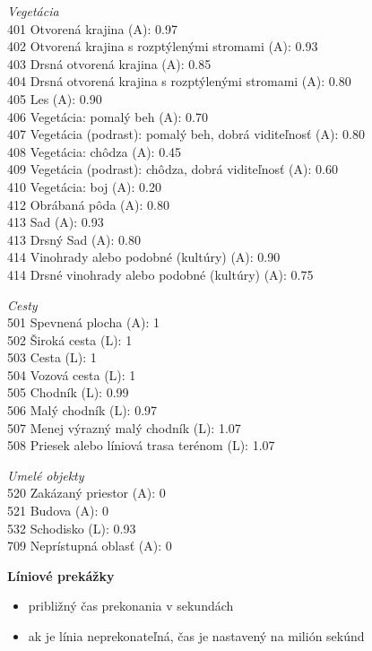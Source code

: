 \documentclass[12pt,a4paper]{report}
\begin{document}
\textit{Vegetácia}\\
401 Otvorená krajina (A): 0.97\\
402 Otvorená krajina s rozptýlenými stromami (A): 0.93\\
403 Drsná otvorená krajina (A): 0.85\\
404 Drsná otvorená krajina s rozptýlenými stromami (A): 0.80\\
405 Les (A): 0.90\\
406 Vegetácia: pomalý beh (A): 0.70\\
407 Vegetácia (podrast): pomalý beh, dobrá viditeľnosť (A): 0.80\\
408 Vegetácia: chôdza (A): 0.45\\
409 Vegetácia (podrast): chôdza, dobrá viditeľnosť (A): 0.60\\
410 Vegetácia: boj (A): 0.20\\
412 Obrábaná pôda (A): 0.80\\
413 Sad (A): 0.93\\
413 Drsný Sad (A): 0.80\\
414 Vinohrady alebo podobné (kultúry) (A): 0.90\\
414 Drsné vinohrady alebo podobné (kultúry) (A): 0.75

\textit{Cesty}\\
501 Spevnená plocha (A): 1\\
502 Široká cesta (L): 1\\
503 Cesta (L): 1\\
504 Vozová cesta (L): 1\\
505 Chodník (L): 0.99\\
506 Malý chodník (L): 0.97\\
507 Menej výrazný malý chodník (L): 1.07\\
508 Priesek alebo líniová trasa terénom (L): 1.07

\textit{Umelé objekty}\\
520 Zakázaný priestor (A): 0\\
521 Budova (A): 0\\
532 Schodisko (L): 0.93\\
709 Neprístupná oblasť (A): 0

\bigskip

\textbf{Líniové prekážky}

\begin{itemize}
    \item približný čas prekonania v sekundách
    \item ak je línia neprekonateľná, čas je nastavený na milión sekúnd
\end{itemize}
\end{document}
